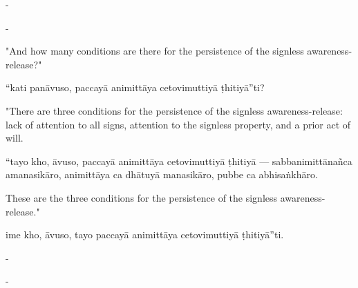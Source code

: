 \begin{samepage}
\begin{leftcolumn*}
-
\end{leftcolumn*}

\begin{rightcolumn}
-
\end{rightcolumn}
\end{samepage}

\begin{samepage}
\begin{leftcolumn*}
"And how many conditions are there for the persistence of the signless awareness-release?"
\end{leftcolumn*}

\begin{rightcolumn}
“kati panāvuso, paccayā animittāya cetovimuttiyā ṭhitiyā”ti?
\end{rightcolumn}
\end{samepage}

\begin{samepage}
\begin{leftcolumn*}
"There are three conditions for the persistence of the signless awareness-release: lack of attention to all signs, attention to the signless property, and a prior act of will.
\end{leftcolumn*}

\begin{rightcolumn}
“tayo kho, āvuso, paccayā animittāya cetovimuttiyā ṭhitiyā — sabbanimittānañca amanasikāro, animittāya ca dhātuyā manasikāro, pubbe ca abhisaṅkhāro.
\end{rightcolumn}
\end{samepage}

\begin{samepage}
\begin{leftcolumn*}
These are the three conditions for the persistence of the signless awareness-release."
\end{leftcolumn*}

\begin{rightcolumn}
ime kho, āvuso, tayo paccayā animittāya cetovimuttiyā ṭhitiyā”ti.
\end{rightcolumn}
\end{samepage}

\begin{samepage}
\begin{leftcolumn*}
-
\end{leftcolumn*}

\begin{rightcolumn}
-
\end{rightcolumn}
\end{samepage}

